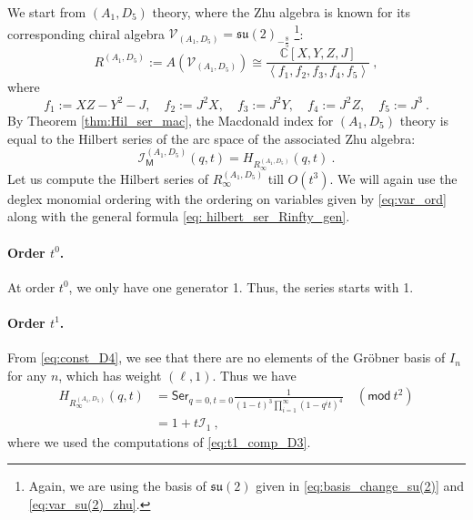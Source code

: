 \documentclass[a4paper,10pt]{article}
\newcommand{\mr}[1]{\mathsf{#1}}
\newcommand{\mf}[1]{\mathfrak{#1}}
\begin{document}
We start from $(A_1, D_5)$ theory, where the Zhu algebra is known for its corresponding chiral algebra $\mathcal{V}_{(A_1, D_5)}=\mathfrak{s u}(2)_{-\frac{8}{5}}$ \cite{Beem:2017ooy}\footnote{Again, we are using the basis of $\mf{su}(2)$ given in \eqref{eq:basis_change_su(2)} and \eqref{eq:var_su(2)_zhu}.}:
\begin{equation}
R^{(A_1, D_5)}:=A\left(\mathcal{V}_{\left(A_1, D_5\right)}\right) \cong \frac{\mathbb{C}[X, Y, Z, J]}{\left\langle f_1, f_2, f_3, f_4, f_5\right\rangle}~,
\end{equation}
where 
\begin{equation}\label{eq:const_D4}
f_1:= XZ - Y^2 - J, \quad  f_2:= J^2 X, \quad f_3:= J^2Y, \quad f_4:= J^2 Z, \quad f_5:= J^3~.
\end{equation}
By Theorem \ref{thm:Hil_ser_mac}, the Macdonald index for $(A_1,D_5)$ theory is equal to the Hilbert series of the arc space of the associated Zhu algebra:
\begin{equation}
\mathcal{I}^{(A_1, D_5)}_{\mr{M}}(q,t) = H_{R^{(A_1, D_5)}_{\infty}}(q, t)~.
\end{equation}
Let us compute the Hilbert series of $R^{(A_1, D_5)}_\infty$ till $O(t^3)$. We will again use the deglex monomial ordering with the ordering on variables given by \eqref{eq:var_ord} along with the general formula \eqref{eq: hilbert_ser_Rinfty_gen}.

\paragraph{Order $t^0$.} At order $t^0$, we only have one generator 1. Thus, the series starts with 1. 
\paragraph{Order $t^1$.} From \eqref{eq:const_D4}, we see that there are no elements of the Gr\"{o}bner basis of $I_n$ for any $n$, which has weight $(\ell,1)$. Thus we have 
\begin{equation}
\begin{aligned}
H_{R^{(A_1, D_5)}_{\infty}}(q, t)&=\mr{Ser}_{q=0, t=0} \frac{1}{(1-t)^3 \prod_{i=1}^{\infty}\left(1-q^i t\right)^4} \quad\left(\mr{mod} ~t^2\right)\\
& = 1+ t \mathcal{I}_1~,
\end{aligned}
\end{equation}
where we used the computations of \eqref{eq:t1_comp_D3}.
\end{document}
